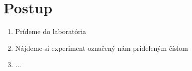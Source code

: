 \section{Postup}

\begin{enumerate}
	\item Prídeme do laboratória
	\item Nájdeme si experiment označený nám prideleným číslom
	\item ...
\end{enumerate}
